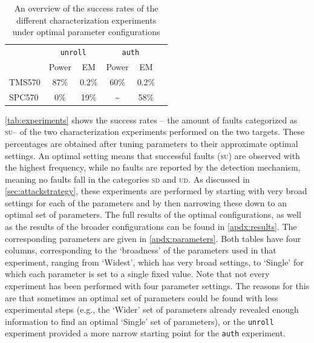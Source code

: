 \documentclass[10pt]{article}
\newcommand{\TI}{TMS570\xspace}
\newcommand{\ST}{SPC570\xspace}
\newcommand{\unroll}{\texttt{unroll}\xspace}
\newcommand{\auth}{\texttt{auth}\xspace}
\newcommand{\UD}{\textsc{ud}\xspace}
\newcommand{\SU}{\textsc{su}\xspace}
\newcommand{\SD}{\textsc{sd}\xspace}
\begin{document}
    \begin{table}[H]
    \centering
    \begin{tabular}{l cc cc c }
    \toprule
             & \multicolumn{2}{c}{\unroll}  
             & \multicolumn{2}{c}{\auth}        
             \\
               
               \cmidrule(lr){2-3}  \cmidrule(lr){4-5}  
             & \multicolumn{1}{c}{Power}                        & \multicolumn{1}{c}{EM}  
             & \multicolumn{1}{c}{Power}                        & \multicolumn{1}{c}{EM}                              
             \\
             \midrule
             \TI      
             & 87\%       %
             & 0.2\%      %
             & 60\%       %
             & 0.2\%      %
             \\
             \ST 
             & 0\% %
             & 19\%      %
             & \textasciitilde          %
             & 58\%       %
             \\
    \bottomrule
    \end{tabular}
    \caption{An overview of the success rates of the different characterization experiments under optimal parameter configurations} 
    \label{tab:experiments}
    \end{table}



    \autoref{tab:experiments} shows the success rates -- the amount of faults categorized as \SU -- of the two characterization experiments performed on the two targets. These percentages are obtained after tuning parameters to their approximate optimal settings. An optimal setting means that successful faults (\SU) are observed with the highest frequency, while no faults are reported by the detection mechanism, meaning no faults fall in the categories \SD and \UD. As discussed in \autoref{sec:attackstrategy}, these experiments are performed by starting with very broad settings for each of the parameters and by then narrowing these down to an optimal set of parameters.    
    The full results of the optimal configurations, as well as the results of the broader configurations can be found in \autoref{apdx:results}. The corresponding parameters are given in \autoref{apdx:parameters}.
    Both tables have four columns, corresponding to the `broadness' of the parameters used in that experiment, ranging from `Widest', which has very broad settings, to `Single' for which each parameter is set to a single fixed value. Note that not every experiment has been performed with four parameter settings. The reasons for this are that sometimes an optimal set of parameters could be found with less experimental steps (e.g., the `Wider' set of parameters already revealed enough information to find an  optimal `Single' set of parameters), or the \unroll experiment provided a more narrow starting point for the \auth experiment.
\end{document}
